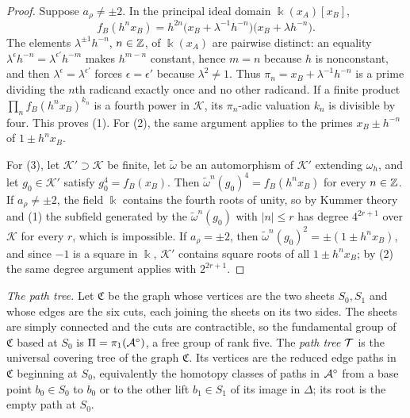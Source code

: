 \begin{proof}
Suppose $a_\rho\neq\pm2$.  In the principal ideal domain $\Bbbk(x_A)[x_B]$,
\[
 f_B(h^nx_B)
 =h^{2n}\bigl(x_B+\lambda^{-1}h^{-n}\bigr)\bigl(x_B+\lambda h^{-n}\bigr).
\]
The elements $\lambda^{\pm1}h^{-n}$, $n\in\mathbb Z$, of $\Bbbk(x_A)$ are pairwise
distinct: an equality $\lambda^{\epsilon}h^{-n}=\lambda^{\epsilon'}h^{-m}$
makes $h^{m-n}$ constant, hence $m=n$ because $h$ is nonconstant, and then
$\lambda^{\epsilon}=\lambda^{\epsilon'}$ forces $\epsilon=\epsilon'$ because
$\lambda^2\neq1$.  Thus $\pi_n=x_B+\lambda^{-1}h^{-n}$ is a prime dividing the
$n$th radicand exactly once and no other radicand.  If a finite product
$\prod_nf_B(h^nx_B)^{k_n}$ is a fourth power in $\mathcal K$, its $\pi_n$-adic
valuation $k_n$ is divisible by four.  This proves (1).  For (2), the same
argument applies to the primes $x_B\pm h^{-n}$ of $1\pm h^nx_B$.

For (3), let $\mathcal K'\supset\mathcal K$ be finite, let $\widetilde\omega$ be an
automorphism of $\mathcal K'$ extending $\omega_h$, and let $g_0\in\mathcal K'$ satisfy
$g_0^4=f_B(x_B)$.  Then $\widetilde\omega^n(g_0)^4=f_B(h^nx_B)$ for every
$n\in\mathbb Z$.  If $a_\rho\neq\pm2$, the field $\Bbbk$ contains the fourth roots of
unity, so by Kummer theory and (1) the subfield generated by the
$\widetilde\omega^n(g_0)$ with $|n|\leq r$ has degree $4^{2r+1}$ over $\mathcal K$
for every $r$, which is impossible.  If $a_\rho=\pm2$, then
$\widetilde\omega^n(g_0)^2=\pm(1\pm h^nx_B)$, and since $-1$ is a square in
$\Bbbk$, $\mathcal K'$ contains square roots of all $1\pm h^nx_B$; by (2) the same
degree argument applies with $2^{2r+1}$.
\end{proof}

\emph{The path tree.}  Let $\mathfrak C$ be the graph whose vertices are the
two sheets $S_0,S_1$ and whose edges are the six cuts, each joining the
sheets on its two sides.  The sheets are simply connected and the cuts are
contractible, so the fundamental group of $\mathfrak C$ based at $S_0$ is
$\Pi=\pi_1(\mathcal A^\circ)$, a free group of rank five.  The \emph{path tree}
$\mathcal T$ is the universal covering tree of the graph $\mathfrak C$.  Its
vertices are the reduced edge paths in $\mathfrak C$ beginning at $S_0$,
equivalently the homotopy classes of paths in $\mathcal A^\circ$ from a base
point $b_0\in S_0$ to $b_0$ or to the other lift $b_1\in S_1$ of its image
in $\Delta$; its root is the empty path at $S_0$.

